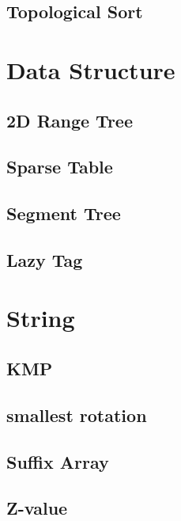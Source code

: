 \subsection{Topological Sort}


\section{Data Structure}

\subsection{2D Range Tree}

\subsection{Sparse Table}

\subsection{Segment Tree}

\subsection{Lazy Tag}




\section{String}

\subsection{KMP}

\subsection{smallest rotation}

\subsection{Suffix Array}

\subsection{Z-value}


